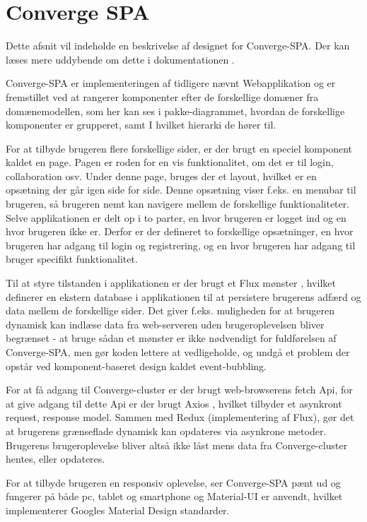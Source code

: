 \section{Converge SPA}

Dette afsnit vil indeholde en beskrivelse af designet for Converge-SPA. Der kan læses mere uddybende om dette i dokumentationen \cite[Converge-SPA]{software-design}.

Converge-SPA er implementeringen af tidligere nævnt Webapplikation og er fremstillet ved at rangerer komponenter efter de forskellige domæner fra domænemodellen, som her kan ses i pakke-diagrammet, hvordan de forskellige komponenter er grupperet, samt I hvilket hierarki de hører til.

For at tilbyde brugeren flere forskellige sider, er der brugt en speciel komponent kaldet en page. Pagen er roden for en vis 
funktionalitet, om det er til login, collaboration osv. Under denne page, bruges der et layout, hvilket er en opsætning der går igen side for side. Denne opsætning viser f.eks. en menubar til brugeren, så brugeren nemt kan navigere mellem de forskellige funktionaliteter. Selve applikationen er delt op i to parter, en hvor brugeren er logget ind og en hvor brugeren ikke er. Derfor er der defineret to forskellige opsætninger, en hvor brugeren har adgang til login og registrering, og en hvor brugeren har adgang til bruger specifikt funktionalitet.

Til at styre tilstanden i applikationen er der brugt et Flux mønster \cite{Flux-pattern}, hvilket definerer en ekstern database i applikationen til at persistere brugerens adfærd og data mellem de forskellige sider. Det giver f.eks. muligheden for at brugeren dynamisk kan indlæse data fra web-serveren uden brugeroplevelsen bliver begrænset - at bruge sådan et mønster er ikke nødvendigt for fuldførelsen af Converge-SPA, men gør koden lettere at vedligeholde, og undgå et problem der opstår ved komponent-baseret design kaldet event-bubbling.

For at få adgang til Converge-cluster er der brugt web-browserens fetch Api, for at give adgang til dette Api er der brugt Axios \cite{Axios}, hvilket tilbyder et asynkront request, response model. Sammen med Redux (implementering af Flux), gør det at brugerens grænseflade dynamisk kan opdateres via asynkrone metoder. Brugerens brugeroplevelse bliver altså ikke låst mens data fra Converge-cluster hentes, eller opdateres.

For at tilbyde brugeren en responsiv oplevelse, ser Converge-SPA pænt ud og fungerer på både pc, tablet og smartphone og Material-UI er anvendt, hvilket implementerer Googles Material Design standarder.
